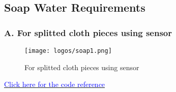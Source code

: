 \documentclass[table]{rapportCS}
\begin{document}
\subsection{Soap Water Requirements}
\subsubsection{A. For splitted cloth pieces using sensor}
\begin{figure}[h]
    \centering
    \texttt{[image: logos/soap1.png]}
    \caption{  For splitted cloth pieces using sensor}
    \label{fig:outlinemindmap}
\end{figure}
\href{https://github.com/naunidhsingh03/ELP305-TribeD-Resources/blob/5ba1988fe283faba21ba7098978bb225e509d5cb/Codes/solvent_dispenser_old_design_1.ino}{\textcolor{blue}{Click here for the code reference}}
\end{document}
